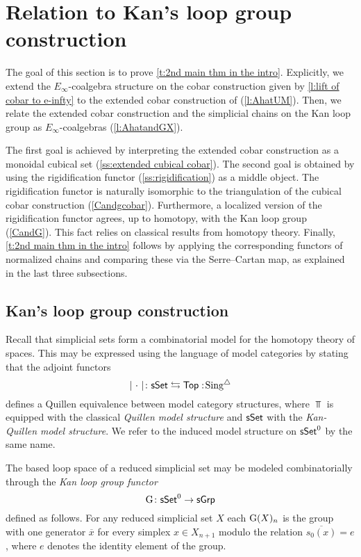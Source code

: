 
\section{Relation to Kan's loop group construction} \label{s:theorem2}

The goal of this section is to prove \cref{t:2nd main thm in the intro}.
Explicitly, we extend the $E_{\infty}$-coalgebra structure on the cobar construction given by \cref{l:lift of cobar to e-infty} to the extended cobar construction of \cite{hess2010cobar} (\cref{l:AhatUM}).
Then, we relate the extended cobar construction and the simplicial chains on the Kan loop group as $E_{\infty}$-coalgebras (\cref{l:AhatandGX}).

The first goal is achieved by interpreting the extended cobar construction as a monoidal cubical set (\cref{ss:extended cubical cobar}).
The second goal is obtained by using the rigidification functor (\cref{ss:rigidification}) as a middle object.
The rigidification functor is naturally isomorphic to the triangulation of the cubical cobar construction (\cref{Candgcobar}).
Furthermore, a localized version of the rigidification functor agrees, up to homotopy, with the Kan loop group (\cref{CandG}).
This fact relies on classical results from homotopy theory.
Finally, \cref{t:2nd main thm in the intro} follows by applying the corresponding functors of normalized chains and comparing these via the Serre--Cartan map, as explained in the last three subsections.

\subsection{Kan's loop group construction}

Recall that simplicial sets form a combinatorial model for the homotopy theory of spaces.
This may be expressed using the language of model categories by stating that the adjoint functors
\[
\lvert\ \cdot\ \rvert \colon \mathsf{sSet} \leftrightarrows \mathsf{Top} :\! \operatorname{Sing^{\triangle}}
\]
defines a Quillen equivalence between model category structures, where $\Top$ is equipped with the classical \textit{Quillen model structure} and $\mathsf{sSet}$ with the \textit{Kan-Quillen model structure}.
We refer to the induced model structure on $\mathsf{sSet}^0$ by the same name.

The based loop space of a reduced simplicial set may be modeled combinatorially through the \textit{Kan loop group functor}
\[
\operatorname{G} \colon \mathsf{sSet}^0 \to \mathsf{sGrp}
\]
defined as follows.
For any reduced simplicial set $X$ each $\operatorname{G}(X)_n$ is the group with one generator $\overline{x}$ for every simplex $x \in X_{n+1}$ modulo the relation $\overline{s_0(x)} = e$, where $e$ denotes the identity element of the group.

